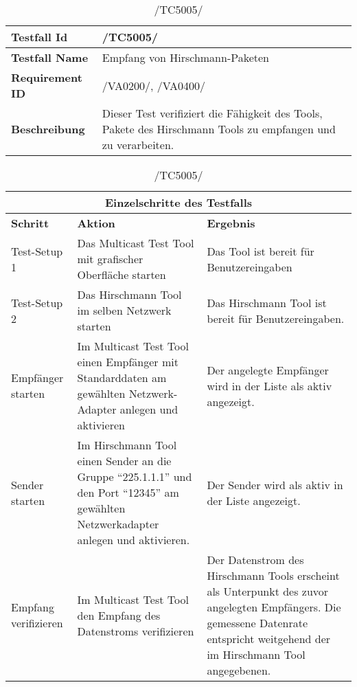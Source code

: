     \begin{table}[h]
        \caption{/TC5005/}
        \label{tab:TC5005}
        \begin{center}
            \begin{tabular}{|p{3.5cm}|p{12cm}|}
                \hline
                    \textbf{Testfall Id} & /TC5005/\\
                \hline
                    \textbf{Testfall Name} & Empfang von Hirschmann-Paketen\\
                \hline
                    \textbf{Requirement ID} & /VA0200/, /VA0400/\\
                \hline
                    \textbf{Beschreibung} & Dieser Test verifiziert die
                    Fähigkeit des Tools, Pakete des Hirschmann Tools zu
                    empfangen und zu verarbeiten.\\
                \hline
            \end{tabular}
            \begin{tabular}{|p{3.5cm}|p{5cm}|p{6.55cm}|}
                \multicolumn{3}{|c|}{\textbf{Einzelschritte des Testfalls}} \\
                \hline
                    \textbf{Schritt} & \textbf{Aktion} & \textbf{Ergebnis}\\
                \hline
                    Test-Setup 1 &
                    Das Multicast Test Tool mit grafischer Oberfläche starten & 
                    Das Tool ist bereit für Benutzereingaben\\
                \hline
                    Test-Setup 2 &
                    Das Hirschmann Tool im selben Netzwerk starten &
                    Das Hirschmann Tool ist bereit für Benutzereingaben. \\
                \hline
                    Empfänger starten &
                    Im Multicast Test Tool einen Empfänger mit Standarddaten am
                    gewählten Netzwerk-Adapter anlegen und aktivieren &
                    Der angelegte Empfänger wird in der Liste als aktiv
                    angezeigt.\\
                \hline
                    Sender starten &
                    Im Hirschmann Tool einen Sender an die Gruppe "`225.1.1.1"'
                    und den Port "`12345"' am gewählten Netzwerkadapter anlegen
                    und aktivieren. &
                    Der Sender wird als aktiv in der Liste angezeigt.\\
                \hline
                    Empfang verifizieren &
                    Im Multicast Test Tool den Empfang des Datenstroms
                    verifizieren &
                    Der Datenstrom des Hirschmann Tools erscheint als
                    Unterpunkt des zuvor angelegten Empfängers. Die
                    gemessene Datenrate entspricht weitgehend der im Hirschmann
                    Tool angegebenen.\\
                \hline
            \end{tabular}
        \end{center}
    \end{table}

